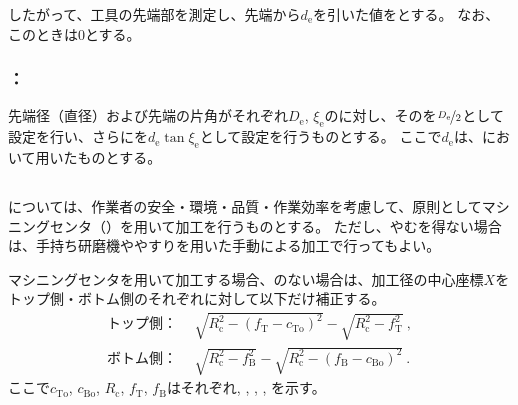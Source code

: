 したがって、工具の先端部を測定し、先端から$d_\mathrm e$を引いた値を\TLCValue とする。
なお、このとき\TLCWearValue は0とする。

\subsubsection{\indexTDCEndFaceCChamferMilling\nameTDCorrection：\EndFaceCChamferMilling}
先端径（直径）および先端の片角がそれぞれ$D_\mathrm e$, $\xi_\mathrm e$の\TaperEndMill に対し、その\TDCValue を$\nicefrac{D_\mathrm e}2$として設定を行い、さらに\TDCWearValue を$d_\mathrm e\tan\xi_\mathrm e$として設定を行うものとする。
ここで$d_\mathrm e$は、\nameTLCorrection において用いたものとする。


\subsection{\EndFaceOutCChamferMilling}
\EndFaceOutCChamfer については、作業者の安全・環境・品質・作業効率を考慮して、原則としてマシニングセンタ（\TaperEndMill）を用いて加工を行うものとする。
ただし、やむを得ない場合は、手持ち研磨機ややすりを用いた手動による加工で行ってもよい。

マシニングセンタを用いて加工する場合、\Outcut のない場合は、加工径の中心座標$X$をトップ側・ボトム側のそれぞれに対して以下だけ補正する。
\begin{align*}
  \text{トップ側：}&~~
  \sqrt{R_\mathrm c^2-\left(f_\mathrm T-c_\mathrm{To}\right)^2}-\sqrt{R_\mathrm c^2-f_\mathrm T^2}\ ,\\
  \text{ボトム側：}&~~
  \sqrt{R_\mathrm c^2-f_\mathrm B^2}-\sqrt{R_\mathrm c^2-\left(f_\mathrm B-c_\mathrm{Bo}\right)^2}\ .
\end{align*}
ここで$c_\mathrm{To}$, $c_\mathrm{Bo}$, $R_\mathrm c$, $f_\mathrm T$, $f_\mathrm B$はそれぞれ\TopEndFaceOutCChamferLength, \BottomEndFaceOutCChamferLength, \CenterCurvatureRadius, \TopAlocationLength, \BottomAlocationLength を示す。


